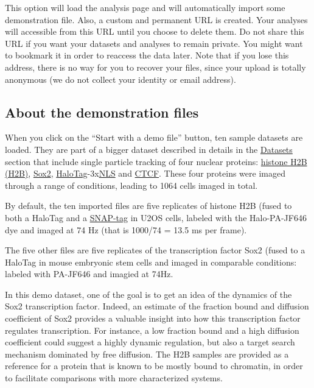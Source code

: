 This option will load the analysis page and will automatically import some demonstration file. Also, a custom and permanent URL is created. Your analyses will accessible from this URL until you choose to delete them. Do not share this URL if you want your datasets and analyses to remain private. You might want to bookmark it in order to reaccess the data later. Note that if you lose this address, there is no way for you to recover your files, since your upload is totally anonymous (we do not collect your identity or email address).

\subsection{About the demonstration files}

When you click on the ``Start with a demo file'' button, ten sample datasets are loaded. They are part of a bigger dataset described in details in the \href{https://spoton.berkeley.edu/SPTGUI/docs/latest#datasets}{Datasets} section that include single particle tracking of four nuclear proteins: \href{https://en.wikipedia.org/wiki/Histone_H2B}{histone H2B (H2B)}, \href{https://en.wikipedia.org/wiki/SOX2}{Sox2}, \href{https://en.wikipedia.org/wiki/HaloTag}{HaloTag}-3x\href{https://en.wikipedia.org/wiki/Nuclear_localization_sequence}{NLS} and \href{https://en.wikipedia.org/wiki/CTCF}{CTCF}. These four proteins were imaged through a range of conditions, leading to 1064 cells imaged in total.

By default, the ten imported files are five replicates of histone H2B (fused to both a HaloTag and a \href{https://en.wikipedia.org/wiki/SNAP-tag}{SNAP-tag} in U2OS cells, labeled with the Halo-PA-JF646 dye and imaged at 74 Hz (that is 1000/74 = 13.5 ms per frame).

The five other files are five replicates of the transcription factor Sox2 (fused to a HaloTag in mouse embryonic stem cells and imaged in comparable conditions: labeled with PA-JF646 and imagied at 74Hz.

In this demo dataset, one of the goal is to get an idea of the dynamics of the Sox2 transcription factor. Indeed, an estimate of the fraction bound and diffusion coefficient of Sox2 provides a valuable insight into how this transcription factor regulates transcription. For instance, a low fraction bound and a high diffusion coefficient could suggest a highly dynamic regulation, but also a target search mechanism dominated by free diffusion. The H2B samples are provided as a reference for a protein that is known to be mostly bound to chromatin, in order to facilitate comparisons with more characterized systems.

